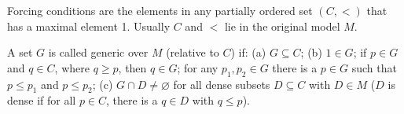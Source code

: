 Forcing conditions are the elements in any partially ordered set $(C, <)$ that has a maximal element 1. Usually $C$ and $<$ lie in the original model $M$.

A set $G$ is called generic over $M$ (relative to $C$) if:
(a) $G \subseteq C$;
(b) $1 \in G$; if $p \in G$ and $q \in C$, where $q \geqslant p$, then $q \in G$; for any $p_1, p_2 \in G$ there is a $p \in G$ such that $p \leqslant p_1$ and $p \leqslant p_2$;
(c) $G \cap D \neq \varnothing$ for all dense subsets $D \subseteq C$ with $D \in M$ ($D$ is dense if for all $p \in C$, there is a $q \in D$ with $q \leqslant p$).